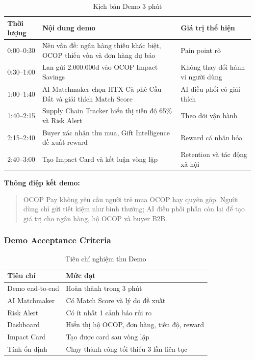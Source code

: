 \documentclass[13pt,a4paper]{extarticle}
\begin{document}
\begin{table}[H]
\centering
\caption{Kịch bản Demo 3 phút}
\begin{tabular}{|p{2cm}|p{6cm}|p{5cm}|}
\hline
\textbf{Thời lượng} & \textbf{Nội dung demo} & \textbf{Giá trị thể hiện} \\
\hline
0:00--0:30 & Nêu vấn đề: ngân hàng thiếu khác biệt, OCOP thiếu vốn và đơn hàng dự báo & Pain point rõ \\
\hline
0:30--1:00 & Lan gửi 2.000.000đ vào OCOP Impact Savings & Không thay đổi hành vi người dùng \\
\hline
1:00--1:40 & AI Matchmaker chọn HTX Cà phê Cầu Đất và giải thích Match Score & AI điều phối có giải thích \\
\hline
1:40--2:15 & Supply Chain Tracker hiển thị tiến độ 65\% và Risk Alert & Theo dõi vận hành \\
\hline
2:15--2:40 & Buyer xác nhận thu mua, Gift Intelligence đề xuất reward & Reward cá nhân hóa \\
\hline
2:40--3:00 & Tạo Impact Card và kết luận vòng lặp & Retention và tác động xã hội \\
\hline
\end{tabular}
\end{table}

\textbf{Thông điệp kết demo:}
\begin{quote}
OCOP Pay không yêu cầu người trẻ mua OCOP hay quyên góp. Người dùng chỉ gửi tiết kiệm như bình thường; AI điều phối phần còn lại để tạo giá trị cho ngân hàng, hộ OCOP và buyer B2B.
\end{quote}

\subsubsection{Demo Acceptance Criteria}

\begin{table}[H]
\centering
\caption{Tiêu chí nghiệm thu Demo}
\begin{tabular}{|p{4cm}|p{9cm}|}
\hline
\textbf{Tiêu chí} & \textbf{Mức đạt} \\
\hline
Demo end-to-end & Hoàn thành trong 3 phút \\
\hline
AI Matchmaker & Có Match Score và lý do đề xuất \\
\hline
Risk Alert & Có ít nhất 1 cảnh báo rủi ro \\
\hline
Dashboard & Hiển thị hộ OCOP, đơn hàng, tiến độ, reward \\
\hline
Impact Card & Tạo được card sau vòng lặp \\
\hline
Tính ổn định & Chạy thành công tối thiểu 3 lần liên tục \\
\hline
\end{tabular}
\end{table}
\end{document}

